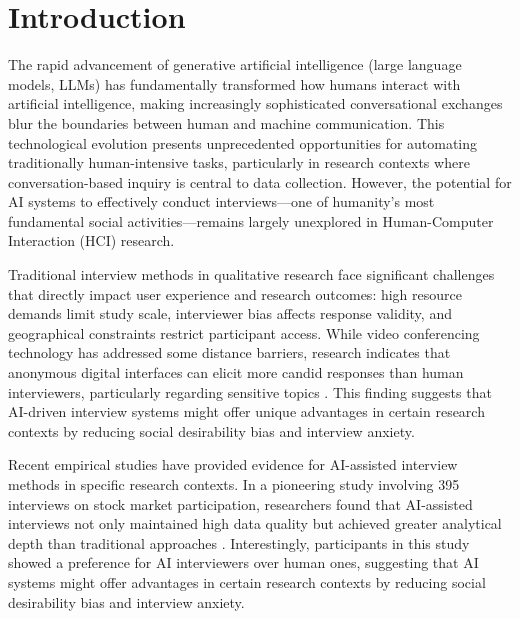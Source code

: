 \documentclass[sigchi,nonacm,manuscript]{acmart}
\begin{document}
\maketitle

\section{Introduction}
The rapid advancement of generative artificial intelligence (large language models, LLMs) has fundamentally transformed how humans interact with artificial intelligence, making increasingly sophisticated conversational exchanges blur the boundaries between human and machine communication. This technological evolution presents unprecedented opportunities for automating traditionally human-intensive tasks, particularly in research contexts where conversation-based inquiry is central to data collection. However, the potential for AI systems to effectively conduct interviews—one of humanity's most fundamental social activities—remains largely unexplored in Human-Computer Interaction (HCI) research.

Traditional interview methods in qualitative research face significant challenges that directly impact user experience and research outcomes: high resource demands limit study scale, interviewer bias affects response validity, and geographical constraints restrict participant access. While video conferencing technology has addressed some distance barriers, research indicates that anonymous digital interfaces can elicit more candid responses than human interviewers, particularly regarding sensitive topics \citep{pichardRoster2020}. This finding suggests that AI-driven interview systems might offer unique advantages in certain research contexts by reducing social desirability bias and interview anxiety.

Recent empirical studies have provided evidence for AI-assisted interview methods in specific research contexts. In a pioneering study involving 395 interviews on stock market participation, researchers found that AI-assisted interviews not only maintained high data quality but achieved greater analytical depth than traditional approaches \citep{chopraConductingQualitativeInterviews2023}. Interestingly, participants in this study showed a preference for AI interviewers over human ones, suggesting that AI systems might offer advantages in certain research contexts by reducing social desirability bias and interview anxiety.
\end{document}

